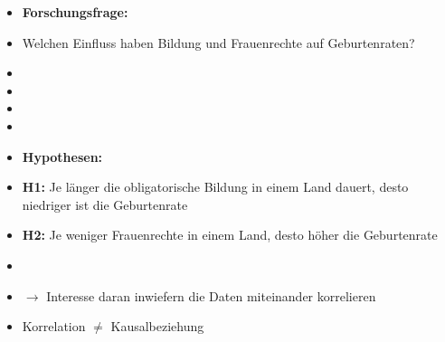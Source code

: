 \documentclass[aspectratio=169, journal, x11names, unknownkeysallowed, hyperref={colorlinks,
linkcolor = SS2,
urlcolor  = F3,
citecolor = F3,
anchorcolor = A4}, 12pt]{beamer}
\newcommand{\oarrow}{\textcolor{A1}{$\rightarrow$} }
\begin{document}
\begin{frame}[t]
  \begin{minipage}[t]{0.5\textwidth}
    \begin{itemize}
      \item[] \textbf{Forschungsfrage:}
      \item Welchen Einfluss haben Bildung und Frauenrechte auf Geburtenraten?
      \scriptsize
      \item[] 
      \item[]  
      \item[] 
      \item[] 
  \end{itemize}
  \end{minipage}%
  \begin{minipage}[t]{0.5\textwidth}
    \begin{itemize}
      \item[] \textbf{Hypothesen:}
      \item[] \textbf{H1:} Je länger die obligatorische Bildung in einem Land dauert, desto niedriger ist die Geburtenrate
      \item[] \textbf{H2:} Je weniger Frauenrechte in einem Land, desto höher die Geburtenrate
      \item[] 
      \item[] \oarrow Interesse daran inwiefern die Daten miteinander korrelieren
      \item[] \footnotesize \begin{tcolorbox}[title=Achtung!, colframe=red!80!black, colback=orange!25]
        \centering
        Korrelation $\neq$ Kausalbeziehung
      \end{tcolorbox}
    \end{itemize}
  \end{minipage}
\end{frame}
\end{document}
